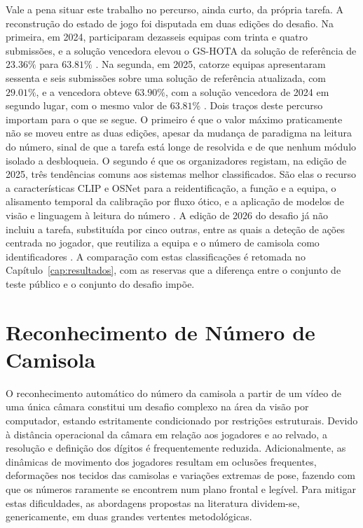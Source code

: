 Vale a pena situar este trabalho no percurso, ainda curto, da própria tarefa. A reconstrução do estado de jogo foi disputada em duas edições do desafio. Na primeira, em 2024, participaram dezasseis equipas com trinta e quatro submissões, e a solução vencedora elevou o GS-HOTA da solução de referência de $23.36\%$ para $63.81\%$ \citep{cioppa2024soccernet}. Na segunda, em 2025, catorze equipas apresentaram sessenta e seis submissões sobre uma solução de referência atualizada, com $29.01\%$, e a vencedora obteve $63.90\%$, com a solução vencedora de 2024 em segundo lugar, com o mesmo valor de $63.81\%$ \citep{giancola2025soccernet}. Dois traços deste percurso importam para o que se segue. O primeiro é que o valor máximo praticamente não se moveu entre as duas edições, apesar da mudança de paradigma na leitura do número, sinal de que a tarefa está longe de resolvida e de que nenhum módulo isolado a desbloqueia. O segundo é que os organizadores registam, na edição de 2025, três tendências comuns aos sistemas melhor classificados. São elas o recurso a características CLIP e OSNet para a reidentificação, a função e a equipa, o alisamento temporal da calibração por fluxo ótico, e a aplicação de modelos de visão e linguagem à leitura do número \citep{giancola2025soccernet}. A edição de 2026 do desafio já não incluiu a tarefa, substituída por cinco outras, entre as quais a deteção de ações centrada no jogador, que reutiliza a equipa e o número de camisola como identificadores \citep{cioppa2026soccernet}. A comparação com estas classificações é retomada no Capítulo~\ref{cap:resultados}, com as reservas que a diferença entre o conjunto de teste público e o conjunto do desafio impõe.

\section{Reconhecimento de Número de Camisola}

O reconhecimento automático do número da camisola a partir de um vídeo de uma única câmara constitui um desafio complexo na área da visão por computador, estando estritamente condicionado por restrições estruturais. Devido à distância operacional da câmara em relação aos jogadores e ao relvado, a resolução e definição dos dígitos é frequentemente reduzida. Adicionalmente, as dinâmicas de movimento dos jogadores resultam em oclusões frequentes, deformações nos tecidos das camisolas e variações extremas de pose, fazendo com que os números raramente se encontrem num plano frontal e legível. Para mitigar estas dificuldades, as abordagens propostas na literatura dividem-se, genericamente, em duas grandes vertentes metodológicas.

